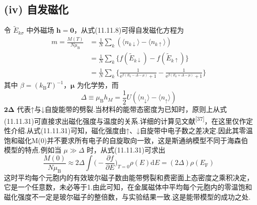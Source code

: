 \subsection*{(iv) 自发磁化}

令 $\widetilde{E}_{k\sigma}$ 中外磁场 $\boldsymbol{h}=\boldsymbol{0}$，从式(11.11.8)可得自发磁化方程为
\begin{equation}
\begin{aligned}
  m=\frac{M(T)}{N\mu_{\mathrm{B}}}&=\frac{1}{N}\sum_{k}(\langle n_{k\downarrow}\rangle-\langle n_{k\uparrow}\rangle)\\
  &=\frac{1}{N}\sum_{k}\{f(\widetilde{E}_{k\downarrow})-f(\widetilde{E}_{k\uparrow})\}\\
  &=\frac{1}{N}\sum_{k}\biggl\{\frac{1}{\mathrm{e}^{\beta(E_{k}-\Delta-\mu)}+1}
  -\frac{1}{\mathrm{e}^{\beta(E_{k}+\Delta-\mu)}+1}\biggr\}
\end{aligned}
\end{equation}
其中 $\beta=(k_{\mathrm{B}}T)^{-1}$，$\boldsymbol{\mu}$ 为化学势，而
\begin{equation*}
  \Delta\equiv\mu_{\mathrm{B}}h_{M}=\frac{1}{2}U(\langle n_{\downarrow}\rangle-\langle n_{\uparrow}\rangle)
\end{equation*}
$\boldsymbol{2\Delta}$ 代表↑与↓自旋能带的劈裂.当材料的能带态密度为已知时，原则上从式(11.11.31)可直接求出磁化强度与温度的关系.详细的计算见文献\textsuperscript{[37]}，在这里仅作定性介绍.从式(11.11.31)可知，磁化强度由↑、↓自旋带中电子数之差决定.因此其零温饱和磁化M(0)并不要求所有电子的自旋取向一致，这是斯通纳模型不同于海森伯模型的特点.例如当 $\mu\gg\Delta$ 时，从式(11.11.31)可求出
\begin{equation}
  \frac{M(0)}{N\mu_{\mathrm{B}}}\approx 2\Delta\int\biggl(-\frac{\partial f}{\partial E}\biggr)_{T=0}\rho(E)\mathrm{d}E
  =(2\Delta)\rho(E_{\mathrm{F}})
\end{equation}
这时平均每个元胞内的有效玻尔磁子数由能带劈裂和费密面上态密度之乘积决定，它是一个任意数，未必等于1.由此可知，在金属磁体中平均每个元胞内的零温饱和磁化强度不一定是玻尔磁子的整倍数，与实验结果一致.这是能带模型的成功之处.

